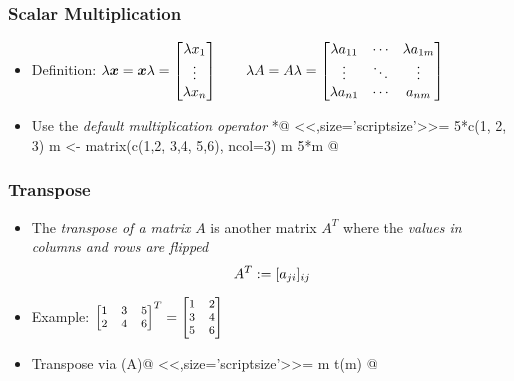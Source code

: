 \documentclass[%
  final,
  11pt, 
  show notes, %
  t, %
  fleqn, %
]{beamer}
\begin{document}
\begin{frame}[fragile]
  \frametitle{Scalar Multiplication}
\begin{itemize}
\item Definition:
$
\lambda \bm{x} =
\bm{x} \lambda = 
\begin{bmatrix}
\lambda x_1 \\
\vdots \\
\lambda x_n
\end{bmatrix}
\qquad
\lambda A = 
A \lambda = 
\begin{bmatrix}
\lambda a_{11} & \cdots & \lambda a_{1m} \\
\vdots & \ddots & \vdots \\
\lambda a_{n1} & \cdots & a_{nm}
\end{bmatrix}
$
\item Use the \emph{default multiplication operator} \verb@*@
<<,size='scriptsize'>>=
5*c(1, 2, 3)
m <- matrix(c(1,2, 3,4, 5,6), ncol=3)
m
5*m
@
\end{itemize}
\end{frame}

\begin{frame}[fragile]
  \frametitle{Transpose}
\begin{itemize}
\item The \emph{transpose of a matrix} $A$ is another matrix $A^T$ where the \emph{values in columns and rows are flipped}
\begin{equation*}
A^T := [a_{ji}]_{ij}
\end{equation*}
\item Example:
$\footnotesize
\begin{bmatrix}
1 & 3 & 5 \\
2 & 4 & 6
\end{bmatrix}^T = \begin{bmatrix}
1 & 2 \\
3 & 4 \\
5 & 6 \end{bmatrix}$
\item Transpose via \verb@t(A)@
<<,size='scriptsize'>>=
m
t(m)
@
\end{itemize}
\end{frame}
\end{document}
